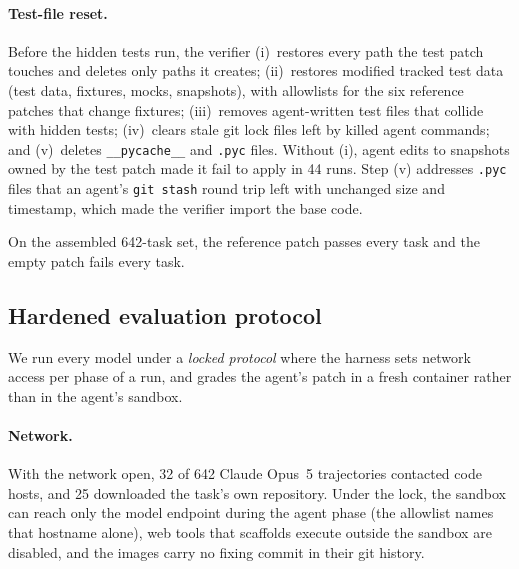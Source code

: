 \paragraph{Test-file reset.}
Before the hidden tests run, the verifier (i)~restores every path the test patch touches and deletes only paths it creates; (ii)~restores modified tracked test data (test data, fixtures, mocks, snapshots), with allowlists for the six reference patches that change fixtures; (iii)~removes agent-written test files that collide with hidden tests; (iv)~clears stale git lock files left by killed agent commands; and (v)~deletes \texttt{\_\_pycache\_\_} and \texttt{.pyc} files. Without (i), agent edits to snapshots owned by the test patch made it fail to apply in 44 runs. Step (v) addresses \texttt{.pyc} files that an agent's \texttt{git stash} round trip left with unchanged size and timestamp, which made the verifier import the base code.

On the assembled 642-task set, the reference patch passes every task and the empty patch fails every task.


\subsection{Hardened evaluation protocol}
\label{sec:protocol}

We run every model under a \textit{locked protocol} where the harness sets network access per phase of a run, and grades the agent's patch in a fresh container rather than in the agent's sandbox.

\paragraph{Network.}
With the network open, 32 of 642 Claude Opus~5 trajectories contacted code hosts, and 25 downloaded the task's own repository. Under the lock, the sandbox can reach only the model endpoint during the agent phase (the allowlist names that hostname alone), web tools that scaffolds execute outside the sandbox are disabled, and the images carry no fixing commit in their git history.

